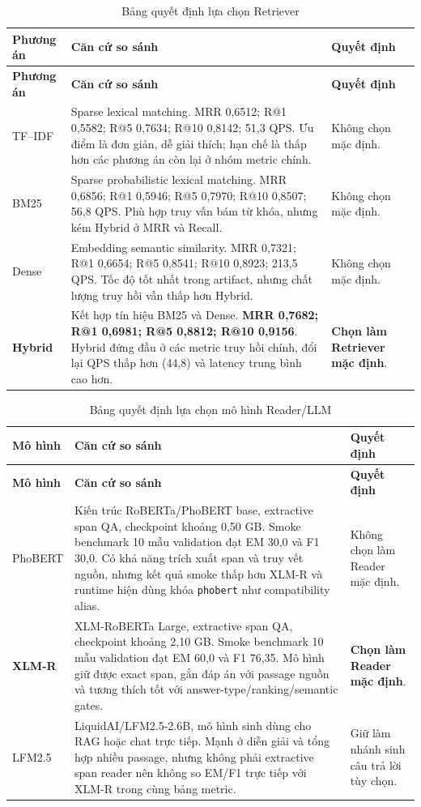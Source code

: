 \documentclass[12pt,a4paper,oneside]{report}
\newcommand{\code}[1]{\texttt{#1}}
\begin{document}
\begin{longtable}{L{3.0cm}L{7.2cm}L{4.0cm}}
\caption{Bảng quyết định lựa chọn Retriever}\label{tab:retriever-selection}\\
\toprule
\textbf{Phương án} & \textbf{Căn cứ so sánh} & \textbf{Quyết định} \\
\midrule
\endfirsthead
\toprule
\textbf{Phương án} & \textbf{Căn cứ so sánh} & \textbf{Quyết định} \\
\midrule
\endhead
TF--IDF & Sparse lexical matching. MRR 0,6512; R@1 0,5582; R@5 0,7634; R@10 0,8142; 51,3 QPS. Ưu điểm là đơn giản, dễ giải thích; hạn chế là thấp hơn các phương án còn lại ở nhóm metric chính. & Không chọn mặc định. \\
BM25 & Sparse probabilistic lexical matching. MRR 0,6856; R@1 0,5946; R@5 0,7970; R@10 0,8507; 56,8 QPS. Phù hợp truy vấn bám từ khóa, nhưng kém Hybrid ở MRR và Recall. & Không chọn mặc định. \\
Dense & Embedding semantic similarity. MRR 0,7321; R@1 0,6654; R@5 0,8541; R@10 0,8923; 213,5 QPS. Tốc độ tốt nhất trong artifact, nhưng chất lượng truy hồi vẫn thấp hơn Hybrid. & Không chọn mặc định. \\
\textbf{Hybrid} & Kết hợp tín hiệu BM25 và Dense. \textbf{MRR 0,7682; R@1 0,6981; R@5 0,8812; R@10 0,9156}. Hybrid đứng đầu ở các metric truy hồi chính, đổi lại QPS thấp hơn (44,8) và latency trung bình cao hơn. & \textbf{Chọn làm Retriever mặc định}. \\
\bottomrule
\end{longtable}

\begin{longtable}{L{3.0cm}L{7.2cm}L{4.0cm}}
\caption{Bảng quyết định lựa chọn mô hình Reader/LLM}\label{tab:model-selection}\\
\toprule
\textbf{Mô hình} & \textbf{Căn cứ so sánh} & \textbf{Quyết định} \\
\midrule
\endfirsthead
\toprule
\textbf{Mô hình} & \textbf{Căn cứ so sánh} & \textbf{Quyết định} \\
\midrule
\endhead
PhoBERT & Kiến trúc RoBERTa/PhoBERT base, extractive span QA, checkpoint khoảng 0,50 GB. Smoke benchmark 10 mẫu validation đạt EM 30,0 và F1 30,0. Có khả năng trích xuất span và truy vết nguồn, nhưng kết quả smoke thấp hơn XLM-R và runtime hiện dùng khóa \code{phobert} như compatibility alias. & Không chọn làm Reader mặc định. \\
\textbf{XLM-R} & XLM-RoBERTa Large, extractive span QA, checkpoint khoảng 2,10 GB. Smoke benchmark 10 mẫu validation đạt EM 60,0 và F1 76,35. Mô hình giữ được exact span, gắn đáp án với passage nguồn và tương thích tốt với answer-type/ranking/semantic gates. & \textbf{Chọn làm Reader mặc định}. \\
LFM2.5 & LiquidAI/LFM2.5-2.6B, mô hình sinh dùng cho RAG hoặc chat trực tiếp. Mạnh ở diễn giải và tổng hợp nhiều passage, nhưng không phải extractive span reader nên không so EM/F1 trực tiếp với XLM-R trong cùng bảng metric. & Giữ làm nhánh sinh câu trả lời tùy chọn. \\
\bottomrule
\end{longtable}
\end{document}
